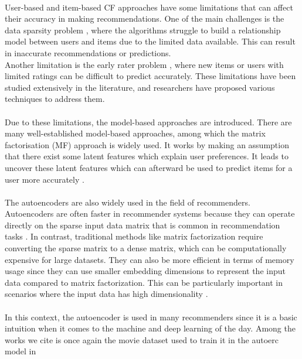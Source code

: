 \documentclass{cup-pan}
\begin{document}
\paragraph{}
User-based and item-based CF approaches have some limitations that can affect their accuracy in making recommendations. One of the main challenges is the data sparsity problem \cite{6}, where the algorithms struggle to build a relationship model between users and items due to the limited data available. This can result in inaccurate recommendations or predictions.
\\
Another limitation is the early rater problem \cite{7}, where new items or users with limited ratings can be difficult to predict accurately. These limitations have been studied extensively in the literature, and researchers have proposed various techniques to address them.
\paragraph{}
Due to these limitations, the model-based approaches are introduced. There are many well-established model-based approaches, among which the matrix factorisation (MF) approach is widely used. It works by making an assumption that there exist some latent features which explain user preferences. It leads to uncover these latent features which can afterward be used to predict items for a user more accurately \cite{8}.
\paragraph{}
The autoencoders are also widely used in the field of recommenders. Autoencoders are often faster in recommender systems because they can operate directly on the sparse input data matrix that is common in recommendation tasks \cite{9}. In contrast, traditional methods like matrix factorization require converting the sparse matrix to a dense matrix, which can be computationally expensive for large datasets. They can also be more efficient in terms of memory usage since they can use smaller embedding dimensions to represent the input data compared to matrix factorization. This can be particularly important in scenarios where the input data has high dimensionality \cite{10}.
\paragraph{}
In this context, the autoencoder is used in many recommenders since it is a basic intuition when it comes to the machine and deep learning of the day. Among the works we cite is once again the movie dataset used to train it in the autoerc model in \cite{11}
\end{document}
